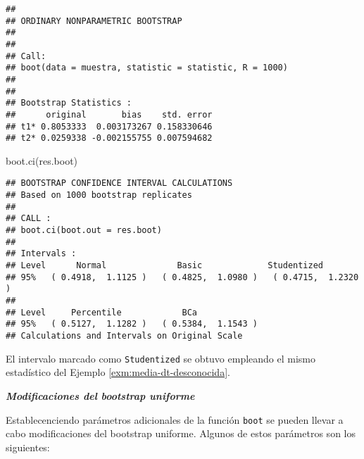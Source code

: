 \documentclass[
]{book}
\newenvironment{Shaded}{\begin{snugshade}}{\end{snugshade}}
\newcommand{\FunctionTok}[1]{\textcolor[rgb]{0.00,0.00,0.00}{#1}}
\newcommand{\NormalTok}[1]{#1}
\theoremstyle{break}
\theoremstyle{definition}
\theoremstyle{definition}
\theoremstyle{definition}
\theoremstyle{definition}
\theoremstyle{remark}
\begin{document}
\begin{verbatim}
## 
## ORDINARY NONPARAMETRIC BOOTSTRAP
## 
## 
## Call:
## boot(data = muestra, statistic = statistic, R = 1000)
## 
## 
## Bootstrap Statistics :
##      original       bias    std. error
## t1* 0.8053333  0.003173267 0.158330646
## t2* 0.0259338 -0.002155755 0.007594682
\end{verbatim}

\begin{Shaded}
\begin{Highlighting}[]
\FunctionTok{boot.ci}\NormalTok{(res.boot)}
\end{Highlighting}
\end{Shaded}

\begin{verbatim}
## BOOTSTRAP CONFIDENCE INTERVAL CALCULATIONS
## Based on 1000 bootstrap replicates
## 
## CALL : 
## boot.ci(boot.out = res.boot)
## 
## Intervals : 
## Level      Normal              Basic             Studentized     
## 95%   ( 0.4918,  1.1125 )   ( 0.4825,  1.0980 )   ( 0.4715,  1.2320 )  
## 
## Level     Percentile            BCa          
## 95%   ( 0.5127,  1.1282 )   ( 0.5384,  1.1543 )  
## Calculations and Intervals on Original Scale
\end{verbatim}

El intervalo marcado como \texttt{Studentized} se obtuvo empleando el mismo estadístico
del Ejemplo \ref{exm:media-dt-desconocida}.

\textbf{\emph{Modificaciones del bootstrap uniforme}}

Establecenciendo parámetros adicionales de la función \texttt{boot} se pueden llevar
a cabo modificaciones del bootstrap uniforme.
Algunos de estos parámetros son los siguientes:
\end{document}
